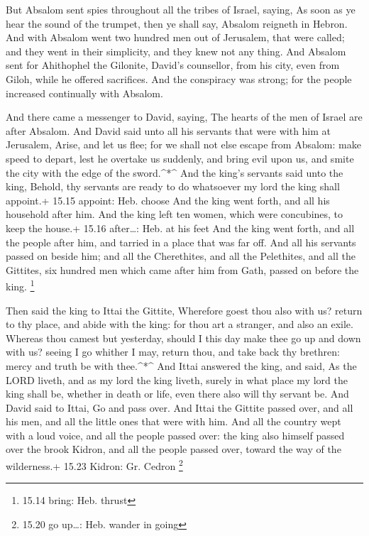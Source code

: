  But Absalom sent spies throughout all the tribes of
Israel, saying, As soon as ye hear the sound of the trumpet, then ye
shall say, Absalom reigneth in Hebron.  And with Absalom
went two hundred men out of Jerusalem, that were called; and they went
in their simplicity, and they knew not any thing.  And
Absalom sent for Ahithophel the Gilonite, David's counsellor, from his
city, even from Giloh, while he offered sacrifices. And the conspiracy
was strong; for the people increased continually with Absalom.

 And there came a messenger to David, saying, The hearts of
the men of Israel are after Absalom.  And David said unto
all his servants that were with him at Jerusalem, Arise, and let us
flee; for we shall not else escape from Absalom: make speed to depart,
lest he overtake us suddenly, and bring evil upon us, and smite the city
with the edge of the sword.\^{}*\^{}  And the king's
servants said unto the king, Behold, thy servants are ready to do
whatsoever my lord the king shall appoint.+ 15.15 appoint: Heb. choose
 And the king went forth, and all his household after him.
And the king left ten women, which were concubines, to keep the house.+
15.16 after\ldots: Heb. at his feet  And the king went
forth, and all the people after him, and tarried in a place that was far
off.  And all his servants passed on beside him; and all
the Cherethites, and all the Pelethites, and all the Gittites, six
hundred men which came after him from Gath, passed on before the king.
\footnote{15.14 bring: Heb. thrust}

 Then said the king to Ittai the Gittite, Wherefore goest
thou also with us? return to thy place, and abide with the king: for
thou art a stranger, and also an exile.  Whereas thou
camest but yesterday, should I this day make thee go up and down with
us? seeing I go whither I may, return thou, and take back thy brethren:
mercy and truth be with thee.\^{}*\^{}  And Ittai answered
the king, and said, As the LORD liveth, and as my lord the king liveth,
surely in what place my lord the king shall be, whether in death or
life, even there also will thy servant be.  And David said
to Ittai, Go and pass over. And Ittai the Gittite passed over, and all
his men, and all the little ones that were with him.  And
all the country wept with a loud voice, and all the people passed over:
the king also himself passed over the brook Kidron, and all the people
passed over, toward the way of the wilderness.+ 15.23 Kidron: Gr. Cedron
\footnote{15.20 go up\ldots: Heb. wander in going}

